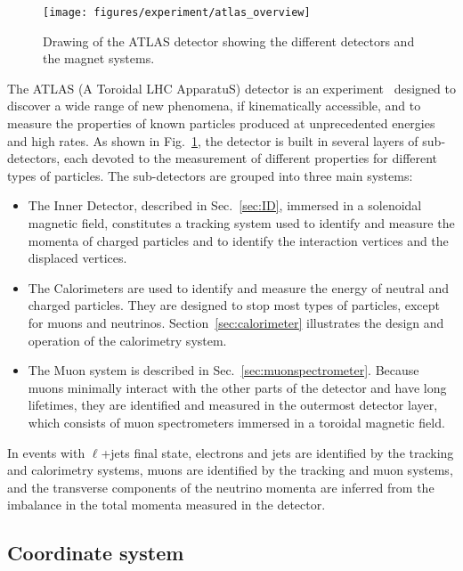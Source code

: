 \begin{figure}[ht]
\begin{center}
\texttt{[image: figures/experiment/atlas\_overview]}
\caption[Drawing of the ATLAS detector]{
  Drawing of the ATLAS detector showing the different detectors and
  the magnet systems.}
\label{fig:ATLAS}
\end{center}
\end{figure}

The ATLAS (A Toroidal LHC ApparatuS) detector is an
experiment~\cite{detectorpaper} designed to discover a wide range of
new phenomena, if kinematically accessible, and to measure the
properties of known particles produced at unprecedented energies and
high rates.
As shown in Fig.~\ref{fig:ATLAS}, the detector is built in several
layers of sub-detectors, each devoted to the measurement of different
properties for different types of particles. The sub-detectors are
grouped into three main systems: 

\begin{itemize}
\item The Inner Detector, described in Sec.~\ref{sec:ID}, immersed in
  a solenoidal magnetic field, constitutes a tracking system used to
  identify and measure the momenta of charged particles and to
  identify the interaction vertices and the displaced vertices. 
\item The Calorimeters are used to identify and measure the energy of
  neutral and charged particles. They are designed to stop most types
  of particles, except for muons and
  neutrinos. Section~\ref{sec:calorimeter} illustrates the design and
  operation of the calorimetry system. 
\item The Muon system is described in
  Sec.~\ref{sec:muonspectrometer}. Because muons minimally interact
  with the other parts of the detector and have long lifetimes, they
  are identified and measured in the outermost detector layer, which
  consists of muon spectrometers immersed in a toroidal magnetic
  field. 
\end{itemize}

In \ttbar{} events with $\ell{}$+jets final state, electrons and jets
are identified by the tracking and calorimetry systems, muons are
identified by the tracking and muon systems, and the transverse
components of the neutrino momenta are inferred from the imbalance in
the total momenta measured in the detector.

\subsection{Coordinate system}
\label{sec:coords}

